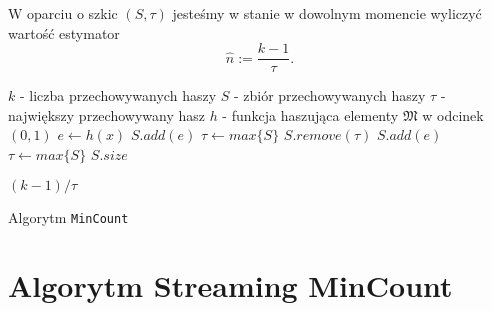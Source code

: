 W oparciu o szkic $(S, {\tau})$ jesteśmy w stanie w dowolnym momencie wyliczyć wartość estymator  $$\hat{n} := \frac{k - 1}{{\tau}}.$$


\begin{algorithm}
    \begin{algorithmic}
    \State $k$ -  liczba przechowywanych haszy 
    \State $S  $ - zbiór przechowywanych haszy
    \State $\tau  $ - największy przechowywany hasz 
    \State $h  $ - funkcja haszująca elementy $\mathfrak{M}$ w odcinek $(0, 1)$
    \newline
        \State $e \gets h(x)$
                \State $S.add(e)$
                \State $\tau \gets max\{S\}$
                \State $S.remove(\tau)$
                \State $S.add(e)$
                \State $\tau \gets max\{S\}$
            \EndIf
        \EndIf
    \EndFunction
    \newline
            \State \Return $S.size$
        
        \Else 
            \State \Return $(k - 1) / \tau$
        \EndIf
    \EndFunction
    
    \end{algorithmic}
    \caption{Algorytm \texttt{MinCount}}
\end{algorithm}

\newpage

\section{Algorytm Streaming MinCount}

